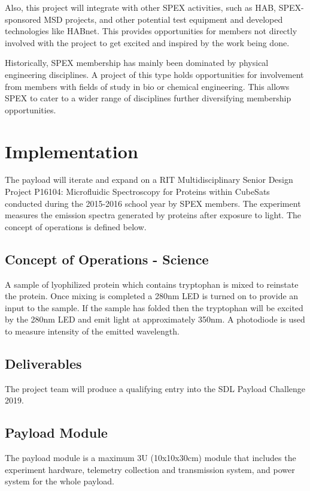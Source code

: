 \documentclass[conference]{IEEEtran} %
\begin{document}
Also, this project will integrate with other SPEX activities, such as HAB, SPEX-sponsored MSD projects, and other potential test equipment and developed technologies like HABnet. This provides opportunities for members not directly involved with the project to get excited and inspired by the work being done.

Historically, SPEX membership has mainly been dominated by physical engineering disciplines. A project of this type holds opportunities for involvement from members with fields of study in bio or chemical engineering. This allows SPEX to cater to a wider range of disciplines further diversifying membership opportunities. 


\section{Implementation}
\label{sec:implementation}
  
The payload will iterate and expand on a RIT Multidisciplinary Senior Design Project P16104: Microfluidic Spectroscopy for Proteins within CubeSats ~\cite{msd} conducted during the 2015-2016 school year by SPEX members. The experiment measures the emission spectra generated by proteins after exposure to light. The concept of operations is defined below. 

\subsection{Concept of Operations - Science}
\label{subsec:operations}
A sample of lyophilized protein which contains tryptophan is mixed to reinstate the protein. Once mixing is completed a 280nm LED is turned on to provide an input to the sample. If the sample has folded then the tryptophan will be excited by the 280nm LED and emit light at approximately 350nm. A photodiode is used to measure intensity of the emitted wavelength.

\subsection{Deliverables}
\label{subsec:deliverables}
The project team will produce a qualifying entry into the SDL Payload Challenge 2019. 

\subsection{Payload Module}
\label{subsec:payload}
The payload module is a maximum 3U (10x10x30cm) module that includes the experiment hardware, telemetry collection and transmission system, and power system for the whole payload.
\end{document}
